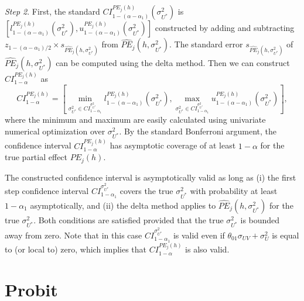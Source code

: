 \documentclass[12pt]{article}
\begin{document}
\noindent \textit{Step 2}. First, the standard $CI_{1-\left( \alpha -\alpha
_{1}\right) }^{PE_{j}(h)}\left( \sigma _{U^{\ast }}^{2}\right) $ is $\left[
l_{1-\left( \alpha -\alpha _{1}\right) }^{PE_{j}(h)}\left( \sigma _{U^{\ast
}}^{2}\right) ,u_{1-\left( \alpha -\alpha _{1}\right) }^{PE_{j}(h)}\left(
\sigma _{U^{\ast }}^{2}\right) \right]$ constructed by adding and
subtracting $z_{1-(\alpha -\alpha _{1})/2}\times s_{\widehat{PE}%
_{j}(h,\sigma _{U^{\ast }}^{2})}$ from $\widehat{PE}_{j}(h,\sigma _{U^{\ast
}}^{2})$. The standard error $s_{\widehat{PE}_{j}(h,\sigma _{U^{\ast
}}^{2})} $ of $\widehat{PE}_{j}(h,\sigma _{U^{\ast }}^{2})$ can be computed
using the delta method. Then we can construct $CI_{1-\alpha }^{PE_{j}(h)}$
as 
\begin{equation*}
CI_{1-\alpha }^{PE_{j}(h)} = \left[\min_{\sigma _{U^{\ast }}^{2}\in
CI_{1-\alpha _{1}}^{\sigma _{U^{\ast }}^{2}}}l_{1-\left( \alpha -\alpha
_{1}\right) }^{PE_{j}(h)}\left( \sigma _{U^{\ast }}^{2}\right) ,
\max_{\sigma _{U^{\ast }}^{2}\in CI_{1-\alpha _{1}}^{\sigma _{U^{\ast
}}^{2}}}u_{1-\left( \alpha -\alpha _{1}\right) }^{PE_{j}(h)}\left( \sigma
_{U^{\ast }}^{2}\right)\right] ,
\end{equation*}%
where the minimum and maximum are easily calculated using univariate
numerical optimization over $\sigma _{U^{\ast }}^{2}$. By the standard
Bonferroni argument, the confidence interval $CI_{1-\alpha }^{PE_{j}(h)}$
has asymptotic coverage of at least $1-\alpha $ for the true partial effect $%
PE_{j}(h)$.

\smallskip

The constructed confidence interval is asymptotically valid as long as (i)
the first step confidence interval $CI_{1-\alpha _{1}}^{\sigma _{U^{\ast
}}^{2}}$ covers the true $\sigma _{U^{\ast }}^{2}$ with probability at least 
$1-\alpha _{1}$ asymptotically, and (ii) the delta method applies to $%
\widehat{PE}_{j}(h,\sigma _{U^{\ast }}^{2})$ for the true $\sigma _{U^{\ast
}}^{2}$. Both conditions are satisfied provided that the true $\sigma
_{U^{\ast }}^{2}$ is bounded away from zero. Note that in this case $%
CI_{1-\alpha _{1}}^{\sigma _{U^{\ast }}^{2}}$ is valid even if $\theta
_{01}\sigma _{UV}+\sigma _{U}^{2}$ is equal to (or local to) zero, which
implies that $CI_{1-\alpha }^{PE_{j}(h)}$ is also valid.

\bigskip

\section{Probit\label{sec:Probit}}
\end{document}
